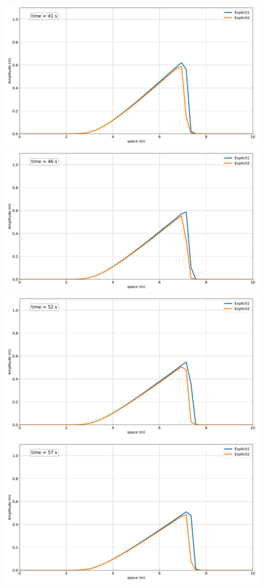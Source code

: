 \includegraphics[width=\linewidth]{../BurgersEquation/images/expl8.pdf}
\includegraphics[width=\linewidth]{../BurgersEquation/images/expl9.pdf}
\includegraphics[width=\linewidth]{../BurgersEquation/images/expl10.pdf}
\includegraphics[width=\linewidth]{../BurgersEquation/images/expl11.pdf}
